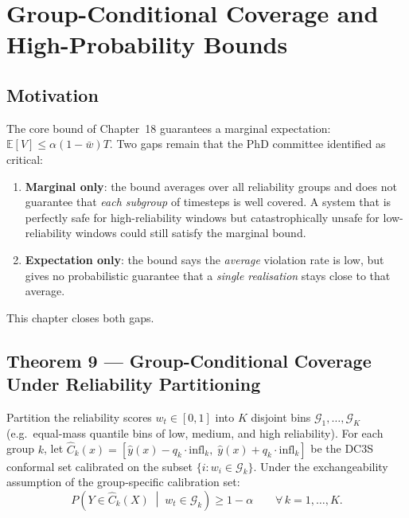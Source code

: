 
\section{Group-Conditional Coverage and High-Probability Bounds}
\label{sec:ch21_conditional_coverage}

\subsection{Motivation}

The core bound of Chapter~18 guarantees a marginal expectation:
$\mathbb{E}[V] \leq \alpha(1-\bar{w})T$.
Two gaps remain that the PhD committee identified as critical:
\begin{enumerate}
  \item \textbf{Marginal only}: the bound averages over all reliability groups
        and does not guarantee that \emph{each subgroup} of timesteps is well
        covered.  A system that is perfectly safe for high-reliability windows
        but catastrophically unsafe for low-reliability windows could still
        satisfy the marginal bound.
  \item \textbf{Expectation only}: the bound says the \emph{average} violation
        rate is low, but gives no probabilistic guarantee that a \emph{single
        realisation} stays close to that average.
\end{enumerate}

This chapter closes both gaps.

\subsection{Theorem 9 — Group-Conditional Coverage Under Reliability Partitioning}

\begin{theorem}\label{thm:mondrian_conditional}
Partition the reliability scores $w_t \in [0,1]$ into $K$ disjoint bins
$\mathcal{G}_1, \ldots, \mathcal{G}_K$ (e.g.\ equal-mass quantile bins of low,
medium, and high reliability).  For each group $k$, let
$\hat{C}_k(x) = [\hat{y}(x) - q_k \cdot \mathrm{infl}_k,\;
                  \hat{y}(x) + q_k \cdot \mathrm{infl}_k]$
be the DC3S conformal set calibrated on the subset
$\{i : w_i \in \mathcal{G}_k\}$.
Under the exchangeability assumption of the group-specific calibration set:
\[
  P\!\left(Y \in \hat{C}_k(X)\;\middle|\; w_t \in \mathcal{G}_k\right) \geq 1 - \alpha
  \qquad \forall\, k = 1,\ldots,K.
\]
\end{theorem}

